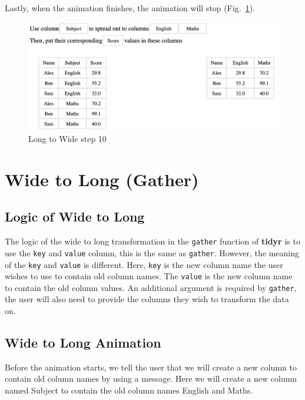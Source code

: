 \newpage
Lastly, when the animation finishes, the animation will stop (Fig.~\ref{fig:spread10}).
\begin{figure}[H]
    \includegraphics[scale = 0.35]{Masters-Thesis/img/spread10.png}
    \caption{Long to Wide step 10}
    \label{fig:spread10}
\end{figure}


\section{Wide to Long (Gather)}
\subsection{Logic of Wide to Long}
The logic of the wide to long transformation in the \texttt{gather} function of \textbf{tidyr} is to use the \texttt{key} and \texttt{value} column, this is the same as \texttt{gather}. However, the meaning of the \texttt{key} and \texttt{value} is different. Here, \texttt{key} is the new column name the user wishes to use to contain old column names. The \texttt{value} is the new column name to contain the old column values. An additional argument is required by \texttt{gather}, the user will also need to provide the columns they wish to transform the data on. 

\subsection{Wide to Long Animation}
Before the animation starts, we tell the user that we will create a new column to contain old column names by using a message. Here we will create a new column named Subject to contain the old column names English and Maths.

